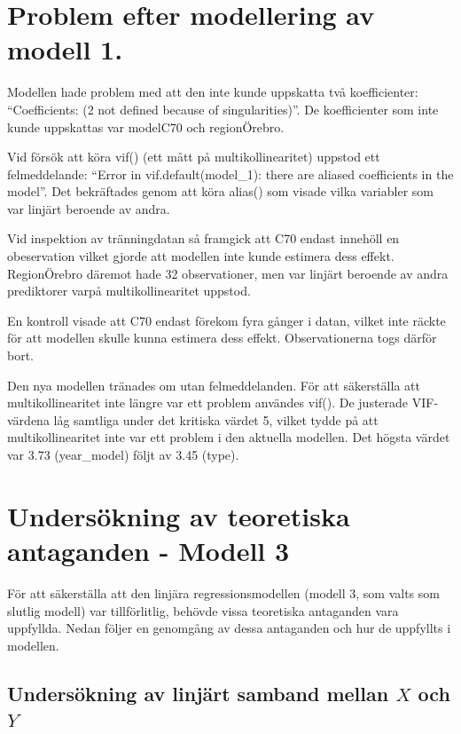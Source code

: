\documentclass[
  letterpaper,
  DIV=11,
  numbers=noendperiod]{scrreprt}
\begin{document}
\section{Problem efter modellering av modell
1.}\label{problem-efter-modellering-av-modell-1.}

Modellen hade problem med att den inte kunde uppskatta två
koefficienter: ``Coefficients: (2 not defined because of
singularities)''. De koefficienter som inte kunde uppskattas var
modelC70 och regionÖrebro.

Vid försök att köra vif() (ett mått på multikollinearitet) uppstod ett
felmeddelande: ``Error in vif.default(model\_1): there are aliased
coefficients in the model''. Det bekräftades genom att köra alias() som
visade vilka variabler som var linjärt beroende av andra.

Vid inspektion av tränningdatan så framgick att C70 endast innehöll en
obeservation vilket gjorde att modellen inte kunde estimera dess effekt.
RegionÖrebro däremot hade 32 observationer, men var linjärt beroende av
andra prediktorer varpå multikollinearitet uppstod.

En kontroll visade att C70 endast förekom fyra gånger i datan, vilket
inte räckte för att modellen skulle kunna estimera dess effekt.
Observationerna togs därför bort.

Den nya modellen tränades om utan felmeddelanden. För att säkerställa
att multikollinearitet inte längre var ett problem användes vif(). De
justerade VIF-värdena låg samtliga under det kritiska värdet 5, vilket
tydde på att multikollinearitet inte var ett problem i den aktuella
modellen. Det högsta värdet var 3.73 (year\_model) följt av 3.45 (type).

\section{Undersökning av teoretiska antaganden - Modell
3}\label{undersuxf6kning-av-teoretiska-antaganden---modell-3}

För att säkerställa att den linjära regressionsmodellen (modell 3, som
valts som slutlig modell) var tillförlitlig, behövde vissa teoretiska
antaganden vara uppfyllda. Nedan följer en genomgång av dessa antaganden
och hur de uppfyllts i modellen.

\subsection{\texorpdfstring{Undersökning av linjärt samband mellan \(X\)
och
\(Y\)}{Undersökning av linjärt samband mellan X och Y}}\label{undersuxf6kning-av-linjuxe4rt-samband-mellan-x-och-y}
\end{document}
